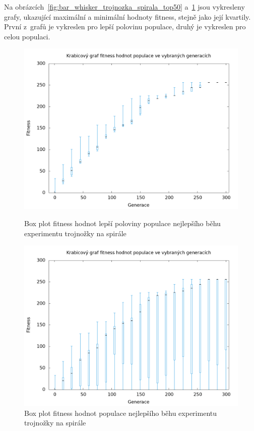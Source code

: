 Na obrázcích~\ref{fig:bar_whisker_trojnozka_spirala_top50} a~\ref{fig:bar_whisker_trojnozka_spirala} jsou vykresleny grafy, ukazující maximální a minimální hodnoty fitness, stejně jako její kvartily.
První z~grafů je vykreslen pro lepší polovinu populace, druhý je vykreslen pro celou populaci.

\begin{figure}[h]
    \begin{minipage}[c]{0.48\linewidth}
        \includegraphics[width=\linewidth]{obrazky/bar_whisker_trojnozka_spirala_top50.png}
        \caption{Box plot fitness hodnot lepší poloviny populace nejlepšího běhu experimentu trojnožky na spirále}
        \label{fig:bar_whisker_trojnozka_spirala_top50}

    \end{minipage}
    \hfill
    \begin{minipage}[c]{0.48\linewidth}
        \includegraphics[width=\linewidth]{obrazky/bar_whisker_trojnozka_spirala.png}
        \caption{Box plot fitness hodnot populace nejlepšího běhu experimentu trojnožky na spirále}
        \label{fig:bar_whisker_trojnozka_spirala}

    \end{minipage}
\end{figure}

